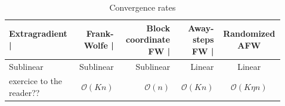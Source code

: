 \documentclass[final]{beamer}
\newlength{\sepwidth}
\newlength{\colwidth}
\newcommand{\separatorcolumn}{\begin{column}{\sepwidth}\end{column}}
\begin{document}
\begin{frame}[t]
\begin{columns}[t]
\begin{column}{\colwidth}
    \begin{table}
      \centering
      \begin{tabular}{l r r r c}
        \toprule
        \textbf{Extragradient |} & \textbf{Frank-Wolfe |} & \textbf{Block coordinate FW |} & \textbf{Away-steps FW |} & \textbf{Randomized AFW}\\
        \midrule
        Sublinear & Sublinear & Sublinear & Linear & Linear\\
        exercice to the reader?? & $\mathcal{O}(Kn)$ & $\mathcal{O}(n)$ & $\mathcal{O}(Kn)$ & $\mathcal{O}(K\eta n)$\\
        \bottomrule
      \end{tabular}
      \caption{Convergence rates}
    \end{table}   
   
   
\end{column}


\separatorcolumn

\begin{column}{\colwidth}


\end{column}
\end{columns}
\end{frame}
\end{document}
